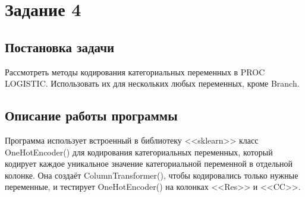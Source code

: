 \documentclass[12pt,a4paper]{article}
\begin{document}
\begin{Shaded}
\begin{Highlighting}[]

\NormalTok{(}\OperatorTok{=}\NormalTok{).fit\_transform(X\_train[[}\NormalTok{, }\NormalTok{, }\NormalTok{]])[:}\NormalTok{])}
\NormalTok{(}\OperatorTok{=}\NormalTok{).fit\_transform(X\_train[[}\NormalTok{, }\NormalTok{, }\NormalTok{]])[:}\NormalTok{])}
\NormalTok{(}\OperatorTok{=}\NormalTok{).fit\_transform(X\_train[[}\NormalTok{, }\NormalTok{, }\NormalTok{]])[:}\NormalTok{])}
\NormalTok{(}\OperatorTok{=}\NormalTok{).fit\_transform(X\_train[[}\NormalTok{, }\NormalTok{, }\NormalTok{]])[:}\NormalTok{])}
\end{Highlighting}
\end{Shaded}

  \newpage
  \section{Задание 4}
  \subsection{Постановка задачи}
  Рассмотреть методы кодирования категориальных переменных в PROC LOGISTIC.
  Использовать их для нескольких любых переменных, кроме Branch.

  \subsection{Описание работы программы}
  Программа использует встроенный в библиотеку <<sklearn>> класс OneHotEncoder() для кодирования категориальных переменных,
  который кодирует каждое уникальное значение категориальной переменной в отдельной колонке.
  Она создаёт ColumnTransformer(), чтобы кодировались только нужные переменные,
  и тестирует OneHotEncoder() на колонках <<Res>> и <<CC>>.
\end{document}
